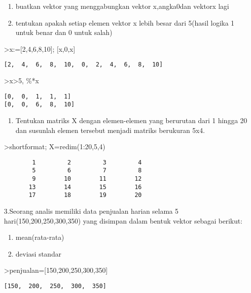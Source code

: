\documentclass[
]{book}
\providecommand{\tightlist}{%
  \setlength{\itemsep}{0pt}\setlength{\parskip}{0pt}}
\begin{document}
\begin{enumerate}
\def\labelenumi{\alph{enumi}.}
\item
  buatkan vektor yang menggabungkan vektor x,angka0dan vektorx lagi
\item
  tentukan apakah setiap elemen vektor x lebih besar dari 5(hasil logika 1 untuk benar dan 0 untuk salah)
\end{enumerate}

\textgreater x:={[}2,4,6,8,10{]}; {[}x,0,x{]}

\begin{verbatim}
[2,  4,  6,  8,  10,  0,  2,  4,  6,  8,  10]
\end{verbatim}

\textgreater x\textgreater5, \%*x

\begin{verbatim}
[0,  0,  1,  1,  1]
[0,  0,  6,  8,  10]
\end{verbatim}

\begin{enumerate}
\def\labelenumi{\arabic{enumi}.}
\setcounter{enumi}{1}
\tightlist
\item
  Tentukan matriks X dengan elemen-elemen yang berurutan dari 1 hingga 20 dan susunlah elemen tersebut menjadi matriks berukuran 5x4.
\end{enumerate}

\textgreater shortformat; X=redim(1:20,5,4)

\begin{verbatim}
        1         2         3         4 
        5         6         7         8 
        9        10        11        12 
       13        14        15        16 
       17        18        19        20 
\end{verbatim}

3.Seorang analis memiliki data penjualan harian selama 5 hari(150,200,250,300,350) yang disimpan dalam bentuk vektor sebagai berikut:

\begin{enumerate}
\def\labelenumi{\alph{enumi}.}
\item
  mean(rata-rata)
\item
  deviasi standar
\end{enumerate}

\textgreater penjualan={[}150,200,250,300,350{]}

\begin{verbatim}
[150,  200,  250,  300,  350]
\end{verbatim}
\end{document}
